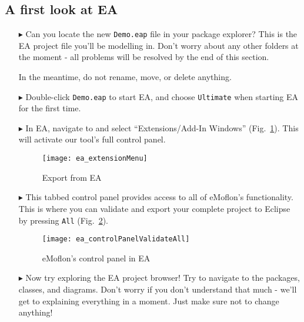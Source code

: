 \clearpage
\genHeader

\subsection{A first look at EA}

\begin{itemize}
\FloatBarrier
\hypertarget{simpleDemo vis}{}
\item[$\blacktriangleright$] Can you locate the new \texttt{Demo.eap} file in your package explorer? This is the EA project file you'll be
modelling in. Don't worry about any other folders at the moment - all problems will be resolved by the end of this section.

In the meantime, do not rename, move, or delete anything.

\item[$\blacktriangleright$] Double-click \texttt{Demo.eap} to start EA, and choose \texttt{Ultimate} when starting EA for the first time.

\item[$\blacktriangleright$] In EA, navigate to and select ``Extensions/Add-In Windows'' (Fig.~\ref{ea:validate_dropdown}). This will activate our tool's full
control panel.

\vspace{0.5cm}

\begin{figure}[htbp]
	\centering
  \texttt{[image: ea\_extensionMenu]}
	\caption{Export from EA} 
	\label{ea:validate_dropdown} 
\end{figure}

\item[$\blacktriangleright$] This tabbed control panel provides access to all of
eMoflon's functionality. This is where you can validate and export your complete project to Eclipse by pressing \texttt{All} (Fig.~\ref{ea:controlPanel}).

\begin{figure}[htbp]
	\centering
  \texttt{[image: ea\_controlPanelValidateAll]}
	\caption{eMoflon's control panel in EA} 
	\label{ea:controlPanel} 
\end{figure}

\item[$\blacktriangleright$] Now try exploring the EA project browser! Try to navigate to the packages, classes, and diagrams. Don't worry if you don't
understand that much - we'll get to explaining everything in a moment. Just make sure not to change anything!


\end{itemize}
